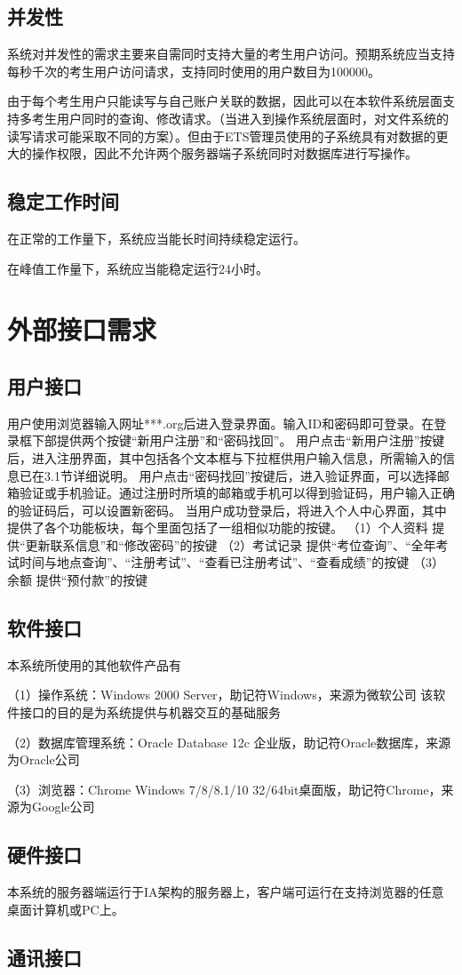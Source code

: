 \subsection{并发性}
系统对并发性的需求主要来自需同时支持大量的考生用户访问。预期系统应当支持每秒千次的考生用户访问请求，支持同时使用的用户数目为100000。

由于每个考生用户只能读写与自己账户关联的数据，因此可以在本软件系统层面支持多考生用户同时的查询、修改请求。（当进入到操作系统层面时，对文件系统的读写请求可能采取不同的方案）。但由于ETS管理员使用的子系统具有对数据的更大的操作权限，因此不允许两个服务器端子系统同时对数据库进行写操作。

\subsection{稳定工作时间}
在正常的工作量下，系统应当能长时间持续稳定运行。

在峰值工作量下，系统应当能稳定运行24小时。

\section{外部接口需求}

\subsection{用户接口}
用户使用浏览器输入网址***.org后进入登录界面。输入ID和密码即可登录。在登录框下部提供两个按键“新用户注册”和“密码找回”。
用户点击“新用户注册”按键后，进入注册界面，其中包括各个文本框与下拉框供用户输入信息，所需输入的信息已在3.1节详细说明。
用户点击“密码找回”按键后，进入验证界面，可以选择邮箱验证或手机验证。通过注册时所填的邮箱或手机可以得到验证码，用户输入正确的验证码后，可以设置新密码。
当用户成功登录后，将进入个人中心界面，其中提供了各个功能板块，每个里面包括了一组相似功能的按键。
（1）个人资料
提供“更新联系信息”和“修改密码”的按键	
（2）考试记录
提供“考位查询”、“全年考试时间与地点查询”、“注册考试”、“查看已注册考试”、“查看成绩”的按键
（3）余额
提供“预付款”的按键

\subsection{软件接口}
本系统所使用的其他软件产品有

（1）操作系统：Windows 2000 Server，助记符Windows，来源为微软公司
该软件接口的目的是为系统提供与机器交互的基础服务

（2）数据库管理系统：Oracle Database 12c 企业版，助记符Oracle数据库，来源为Oracle公司

（3）浏览器：Chrome Windows 7/8/8.1/10 32/64bit桌面版，助记符Chrome，来源为Google公司


\subsection{硬件接口}
 本系统的服务器端运行于IA架构的服务器上，客户端可运行在支持浏览器的任意桌面计算机或PC上。

\subsection{通讯接口}

